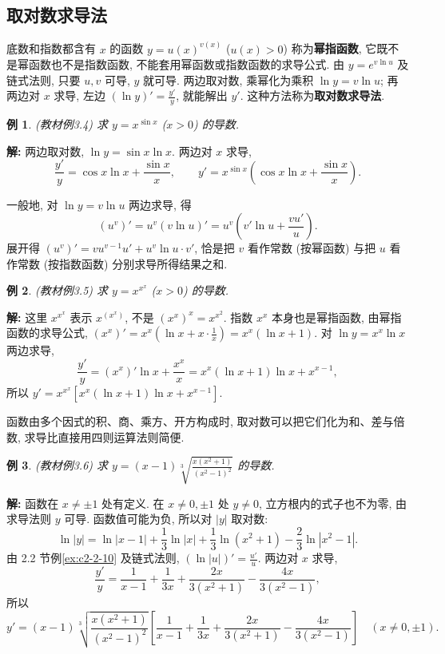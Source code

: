 \documentclass[UTF8,openany]{ctexbook}
\theoremstyle{chinesetextbook}
\newtheorem{example}{例}[section]
\newenvironment{cnsolution}{\par\indent\textbf{解:} \ignorespaces}{\par}
\begin{document}
\subsection{取对数求导法}
底数和指数都含有 $x$ 的函数 $y=u(x)^{v(x)}$ ($u(x)>0$) 称为\textbf{幂指函数}, 它既不是幂函数也不是指数函数, 不能套用幂函数或指数函数的求导公式. 由 $y=e^{v\ln u}$ 及链式法则, 只要 $u,v$ 可导, $y$ 就可导. 两边取对数, 乘幂化为乘积 $\ln y=v\ln u$; 再两边对 $x$ 求导, 左边 $\displaystyle(\ln y)'=\frac{y'}y$, 就能解出 $y'$. 这种方法称为\textbf{取对数求导法}.
\begin{example}\label{ex:c2-3-4}
\textnormal{(教材例3.4)} 求 $y=x^{\sin x}$ ($x>0$) 的导数.
\end{example}
\begin{cnsolution}
两边取对数, $\ln y=\sin x\ln x$. 两边对 $x$ 求导,
\[
\frac{y'}y=\cos x\ln x+\frac{\sin x}x,\qquad y'=x^{\sin x}\left(\cos x\ln x+\frac{\sin x}x\right).
\]
\end{cnsolution}
一般地, 对 $\ln y=v\ln u$ 两边求导, 得
\[
\left(u^v\right)'=u^v(v\ln u)'=u^v\left(v'\ln u+\frac{vu'}u\right).
\]
展开得 $\left(u^v\right)'=vu^{v-1}u'+u^v\ln u\cdot v'$, 恰是把 $v$ 看作常数 (按幂函数) 与把 $u$ 看作常数 (按指数函数) 分别求导所得结果之和.
\begin{example}\label{ex:c2-3-5}
\textnormal{(教材例3.5)} 求 $y=x^{x^x}$ ($x>0$) 的导数.
\end{example}
\begin{cnsolution}
这里 $x^{x^x}$ 表示 $x^{(x^x)}$, 不是 $(x^x)^x=x^{x^2}$. 指数 $x^x$ 本身也是幂指函数, 由幂指函数的求导公式, $\displaystyle(x^x)'=x^x\left(\ln x+x\cdot\frac1x\right)=x^x(\ln x+1)$. 对 $\ln y=x^x\ln x$ 两边求导,
\[
\frac{y'}y=(x^x)'\ln x+\frac{x^x}x=x^x(\ln x+1)\ln x+x^{x-1},
\]
所以 $y'=x^{x^x}\left[x^x(\ln x+1)\ln x+x^{x-1}\right]$.
\end{cnsolution}
函数由多个因式的积、商、乘方、开方构成时, 取对数可以把它们化为和、差与倍数, 求导比直接用四则运算法则简便.
\begin{example}\label{ex:c2-3-6}
\textnormal{(教材例3.6)} 求 $\displaystyle y=(x-1)\sqrt[3]{\frac{x(x^2+1)}{(x^2-1)^2}}$ 的导数.
\end{example}
\begin{cnsolution}
函数在 $x\ne\pm1$ 处有定义. 在 $x\ne0,\pm1$ 处 $y\ne0$, 立方根内的式子也不为零, 由求导法则 $y$ 可导. 函数值可能为负, 所以对 $|y|$ 取对数:
\[
\ln|y|=\ln|x-1|+\frac13\ln|x|+\frac13\ln(x^2+1)-\frac23\ln|x^2-1|.
\]
由 2.2 节例\ref{ex:c2-2-10} 及链式法则, $\displaystyle(\ln|u|)'=\frac{u'}u$. 两边对 $x$ 求导,
\[
\frac{y'}y=\frac1{x-1}+\frac1{3x}+\frac{2x}{3(x^2+1)}-\frac{4x}{3(x^2-1)},
\]
所以
\[
y'=(x-1)\sqrt[3]{\frac{x(x^2+1)}{(x^2-1)^2}}\left[\frac1{x-1}+\frac1{3x}+\frac{2x}{3(x^2+1)}-\frac{4x}{3(x^2-1)}\right]\quad(x\ne0,\pm1).
\]
\end{cnsolution}
\end{document}
